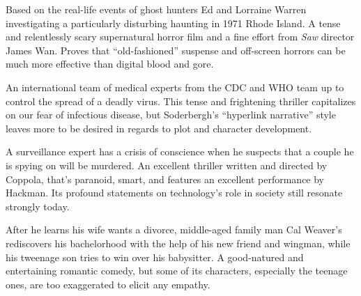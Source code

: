    Based on the real-life events of ghost hunters Ed and Lorraine Warren investigating a particularly disturbing haunting in 1971 Rhode Island. A tense and relentlessly scary supernatural horror film and a fine effort from \textit{Saw} director James Wan. Proves that ``old-fashioned'' suspense and off-screen horrors can be much more effective than digital blood and gore. \author{DW} 

   An international team of medical experts from the CDC and WHO team up to control the spread of a deadly virus. This tense and frightening thriller capitalizes on our fear of infectious disease, but Soderbergh's ``hyperlink narrative'' style leaves more to be desired in regards to plot and character development. \author{DW} 

   A surveillance expert has a crisis of conscience when he suspects that a couple he is spying on will be murdered. An excellent thriller written and directed by Coppola, that's paranoid, smart, and features an excellent performance by Hackman. Its profound statements on technology's role in society still resonate strongly today. \author{DW} 

   After he learns his wife wants a divorce, middle-aged family man Cal Weaver's rediscovers his bachelorhood with the help of his new friend and wingman, while his tweenage son tries to win over his babysitter. A good-natured and entertaining romantic comedy, but some of its characters, especially the teenage ones, are too exaggerated to elicit any empathy. \author{DW} 
